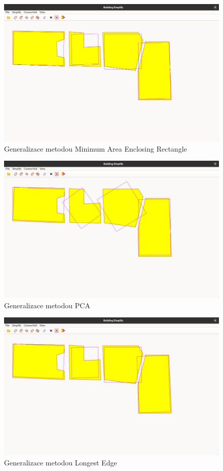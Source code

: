 \begin{figure}[H]
    \centering
    \includegraphics[width=\textwidth]{images/Ukazaka_maer.JPG}
    \caption{Generalizace metodou Minimum Area Enclosing Rectangle}
\end{figure}

\begin{figure}[H]
    \centering
    \includegraphics[width=\textwidth]{images/Ukazaka_pca.JPG}
    \caption{Generalizace metodou PCA}
\end{figure}

\begin{figure}[H]
    \centering
    \includegraphics[width=\textwidth]{images/Ukazaka_le.JPG}
    \caption{Generalizace metodou Longest Edge}
\end{figure}

